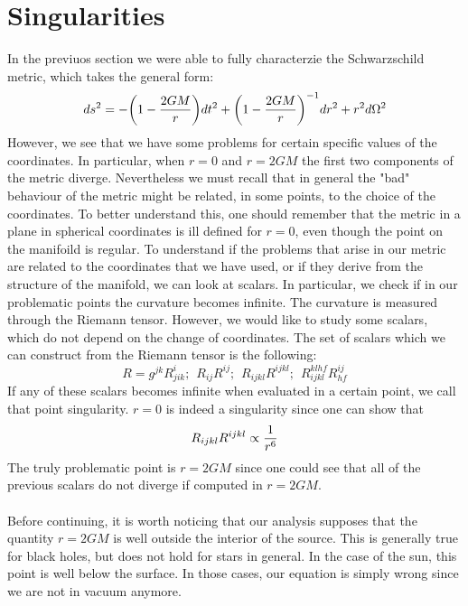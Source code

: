 \documentclass[]{article}
\theoremstyle{definition}
\theoremstyle{Theorem}
\theoremstyle{definition}
\theoremstyle{definition}
\theoremstyle{definition}
\begin{document}
\section{Singularities}
In the previuos section we were able to fully characterzie the Schwarzschild metric, which takes the general form:
$$ds^2=-\bigg(1-{2GM\over r}\bigg)dt^2+\bigg(1-{2GM\over r}\bigg)^{-1}dr^2+r^2d\Omega^2$$
However, we see that we have some problems for certain specific values of the coordinates. In particular, when $r=0$ and $r=2GM$ the first two components of the metric diverge. Nevertheless we must recall that in general the "bad" behaviour of the metric might be related, in some points, to the choice of the coordinates. To better understand this, one should remember that the metric in a plane in spherical coordinates is ill defined for $r=0$, even though the point on the manifoild is regular. To understand if the problems that arise in our metric are related to the coordinates that we have used, or if they derive from the structure of the manifold, we can look at scalars. In particular, we check if in our problematic points the curvature becomes infinite. The curvature is measured through the Riemann tensor. However, we would like to study some scalars, which do not depend on the change of coordinates. The set of scalars which we can construct from the Riemann tensor is the following:
$$R=g^{jk}R^i_{jik};\hspace{5pt}R_{ij}R^{ij};\hspace{5pt}R_{ijkl}R^{ijkl};\hspace{5pt}R_{ijkl}^{klhf}R_{hf}^{ij}$$ 
If any of these scalars becomes infinite when evaluated in a certain point, we call that point singularity.
$r=0$ is indeed a singularity since one can show that
$$R_{ijkl}R^{ijkl}\propto {1\over r^6}$$
The truly problematic point is $r=2GM$ since one could see that all of the previous scalars do not diverge if computed in $r=2GM$.\\
\\
Before continuing, it is worth noticing that our analysis supposes that the quantity $r=2GM$ is well outside the interior of the source. This is generally true for black holes, but does not hold for stars in general. In the case of the sun, this point is well below the surface. In those cases, our equation is simply wrong since we are not in vacuum anymore.
\end{document}
